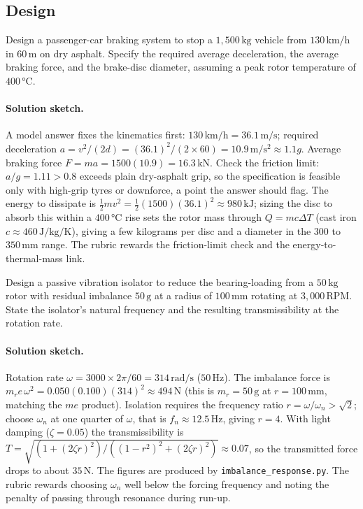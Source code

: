\subsection*{Design}

\begin{exercise}
Design a passenger-car braking system to stop a $1{,}500\,\si{
\kilogram}$ vehicle from $130\,\si{\kilo\meter\per\hour}$ in
$60\,\si{\meter}$ on dry asphalt. Specify the required average
deceleration, the average braking force, and the brake-disc
diameter, assuming a peak rotor temperature of $400\,\si{\degreeCelsius}$.
\paragraph{Solution sketch.} A model answer fixes the kinematics
first: $130\,\si{\kilo\meter\per\hour}=36.1\,\si{\meter\per\second}$;
required deceleration $a=v^{2}/(2d)=(36.1)^{2}/(2\times 60)=10.9\,\si{
\meter\per\second\squared}\approx 1.1g$. Average braking force
$F=ma=1500(10.9)=16.3\,\si{\kilo\newton}$. Check the friction limit:
$a/g=1.11>0.8$ exceeds plain dry-asphalt grip, so the specification is
feasible only with high-grip tyres or downforce, a point the answer
should flag. The energy to dissipate is $\tfrac{1}{2}mv^{2}=
\tfrac{1}{2}(1500)(36.1)^{2}\approx 980\,\si{\kilo\joule}$; sizing the
disc to absorb this within a $400\,\si{\degreeCelsius}$ rise sets the
rotor mass through $Q=mc\Delta T$ (cast iron $c\approx 460\,\si{\joule
\per\kilogram\per\kelvin}$), giving a few kilograms per disc and a
diameter in the $300$ to $350\,\si{\milli\meter}$ range. The rubric
rewards the friction-limit check and the energy-to-thermal-mass link.
\end{exercise}

\begin{exercise}
Design a passive vibration isolator to reduce the bearing-loading
from a $50\,\si{\kilogram}$ rotor with residual imbalance $50\,\si{
\gram}$ at a radius of $100\,\si{\milli\meter}$ rotating at
$3{,}000\,\text{RPM}$. State the isolator's natural frequency and
the resulting transmissibility at the rotation rate.
\paragraph{Solution sketch.} Rotation rate $\omega=3000\times 2\pi/60=
314\,\si{\radian\per\second}$ ($50\,\si{\hertz}$). The imbalance force
is $m_{r}e\,\omega^{2}=0.050(0.100)(314)^{2}\approx 494\,\si{\newton}$
(this is $m_{r}=50\,\si{\gram}$ at $r=100\,\si{\milli\meter}$,
matching the $m e$ product). Isolation requires the frequency ratio
$r=\omega/\omega_{n}>\sqrt{2}$; choose $\omega_{n}$ at one quarter of
$\omega$, that is $f_{n}\approx 12.5\,\si{\hertz}$, giving $r=4$. With
light damping ($\zeta=0.05$) the transmissibility is $T=\sqrt{(1+(2
\zeta r)^{2})/((1-r^{2})^{2}+(2\zeta r)^{2})}\approx 0.07$, so the
transmitted force drops to about $35\,\si{\newton}$. The figures are
produced by \texttt{imbalance\_response.py}. The rubric rewards
choosing $\omega_{n}$ well below the forcing frequency and noting the
penalty of passing through resonance during run-up.
\end{exercise}


